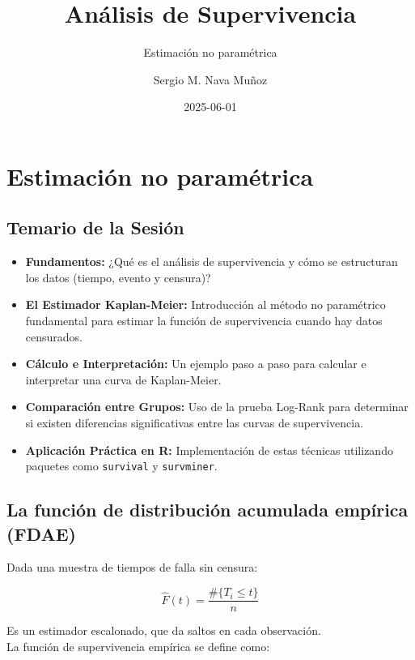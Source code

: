 \documentclass[
]{article}
\title{Análisis de Supervivencia}
\subtitle{Estimación no paramétrica}
\author{Sergio M. Nava Muñoz}
\date{2025-06-01}
\renewcommand*\contentsname{Table of contents}
\newcommand\contentsname{Table of contents}
\begin{document}
\maketitle

\renewcommand*\contentsname{Table of contents}
{
\hypersetup{linkcolor=}
\setcounter{tocdepth}{2}
\tableofcontents
}

\section{Estimación no
paramétrica}\label{estimaciuxf3n-no-paramuxe9trica}

\subsection{Temario de la Sesión}\label{temario-de-la-sesiuxf3n}

\begin{itemize}
\item
  \textbf{Fundamentos:} ¿Qué es el análisis de supervivencia y cómo se
  estructuran los datos (tiempo, evento y censura)?
\item
  \textbf{El Estimador Kaplan-Meier:} Introducción al método no
  paramétrico fundamental para estimar la función de supervivencia
  cuando hay datos censurados.
\item
  \textbf{Cálculo e Interpretación:} Un ejemplo paso a paso para
  calcular e interpretar una curva de Kaplan-Meier.
\item
  \textbf{Comparación entre Grupos:} Uso de la prueba Log-Rank para
  determinar si existen diferencias significativas entre las curvas de
  supervivencia.
\item
  \textbf{Aplicación Práctica en R:} Implementación de estas técnicas
  utilizando paquetes como \texttt{survival} y \texttt{survminer}.
\end{itemize}

\subsection{La función de distribución acumulada empírica
(FDAE)}\label{la-funciuxf3n-de-distribuciuxf3n-acumulada-empuxedrica-fdae}

Dada una muestra de tiempos de falla sin censura:

\[
\hat{F}(t) = \frac{\#\{T_i \leq t\}}{n}
\]

Es un estimador escalonado, que da saltos en cada observación.\\
La función de supervivencia empírica se define como:
\end{document}
